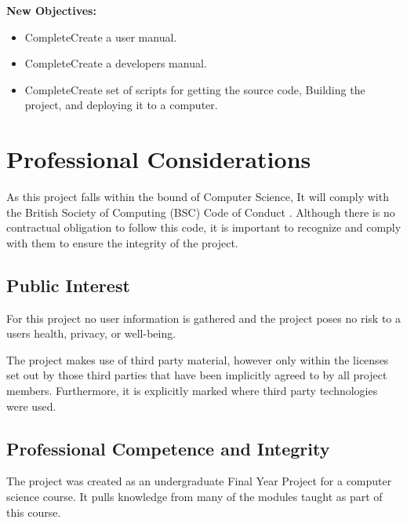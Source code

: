 \documentclass[a4paper]{report}
\begin{document}
\textbf {New Objectives:}


\begin{itemize}
\item \lbrack Complete\rbrack Create a user manual.
\item \lbrack Complete\rbrack Create a developers manual.
\item \lbrack Complete\rbrack Create set of scripts for getting the source code, Building the project, and deploying it to a computer.
\end{itemize}















\chapter{Professional Considerations}

As this project falls within the bound of Computer Science, It will comply with the British Society of Computing (BSC) Code of Conduct \cite{CoC}. Although there is no contractual obligation to follow this code, it is important to recognize and comply with them to ensure the integrity of the project.

\section{Public Interest}

For this project no user information is gathered and the project poses no risk to a users health, privacy, or well-being.

The project makes use of third party material, however only within the licenses set out by those third parties that have been implicitly agreed to by all project members. Furthermore, it is explicitly marked where third party technologies were used.


\section{Professional Competence and Integrity}

The project was created as an undergraduate Final Year Project for a computer science course. It pulls knowledge from many of the modules taught as part of this course.
\end{document}
